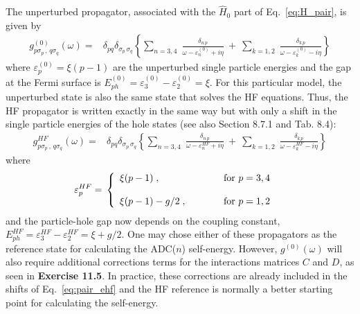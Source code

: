 The unperturbed propagator, associated with the $\widehat{H}_0$ part of Eq.~\eqref{eq:H_pair}, is given by
  \begin{align}
   g^{(0)}_{p \sigma_p \, ,\, q \sigma_q}(\omega) ={}& \delta_{p q} \delta_{\sigma_p \,  \sigma_q} 
   \left\{ \sum_{n=3,4}  \;  \frac {\delta_{n \,  p} }{ \omega - \varepsilon^{(0)}_n + i\eta}
   ~+~ \sum_{k=1,2 }  \;  \frac {\delta_{k \, p} }{ \omega - \varepsilon^{(0)}_k - i\eta}
\right\}  
\label{eq:pair_h0}
\end{align}
where $\varepsilon^{(0)}_p = \xi (p-1)$ are the unperturbed single particle energies and the gap at the Fermi surface is \hbox{$E^{(0)}_{ph} = \varepsilon^{(0)}_3 - \varepsilon^{(0)}_2 = \xi$}.  
For this particular model, the unperturbed state is also the same state that solves the HF equations. Thus, the HF propagator is written exactly in the
same way but with only a shift in the single particle energies of the hole states (see also  Section 8.7.1 and Tab. 8.4):
  \begin{align}
   g^{HF}_{p \sigma_p \, ,\, q \sigma_q}(\omega) ={}& \delta_{p q} \delta_{\sigma_p \,  \sigma_q} 
   \left\{ \sum_{n=3, 4}  \;  \frac {\delta_{n \,  p} }{ \omega - \varepsilon^{HF}_n + i\eta}
   ~+~ \sum_{k=1, 2}  \;  \frac {\delta_{k \, p} }{ \omega - \varepsilon^{HF}_k - i\eta}
\right\}  
\label{eq:pair_gHF}
\end{align}
where
  \begin{align}
  \varepsilon^{HF}_p ={}& \left\{ 
  \begin{array}{lcl}
    \xi (p-1) \; , &   \qquad & \hbox{for~} p=3,4 \\
    ~\\
    \xi (p-1) - g/2 \; , &   \qquad & \hbox{for~} p=1,2    
  \end{array}
  \right.
  \label{eq:pair_ehf}
\end{align}
and the particle-hole gap now depends on the coupling constant, \hbox{$E^{HF}_{ph} = \varepsilon^{HF}_3 - \varepsilon^{HF}_2 = \xi + g/2$}.  One may chose either  of these propagators as the reference state for calculating the ADC($n$) self-energy. However,  $g^{(0)}(\omega)$ will also require  additional corrections terms for the interactions matrices $C$ and $D$, as seen in {\bf Exercise 11.5}.  In practice, these corrections are already included in the shifts of Eq.~\eqref{eq:pair_ehf} and the HF reference is normally a better starting point for calculating the self-energy.


